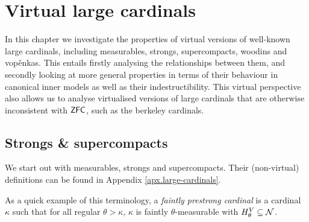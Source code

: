 \documentclass[../../main]{subfiles}
\begin{document}
\chapter{Virtual large cardinals}
\label{chapter.virtual-large-cardinals}
\thispagestyle{fancy}

In this chapter we investigate the properties of virtual versions of well-known large cardinals, including measurables, strongs, supercompacts, woodins and vop\v enkas. This entails firstly analysing the relationships between them, and secondly looking at more general properties in terms of their behaviour in canonical inner models as well as their indestructibility. This virtual perspective also allows us to analyse virtualised versions of large cardinals that are otherwise inconsistent with $\textsf{ZFC}$, such as the berkeley cardinals.


\section{Strongs \& supercompacts}

We start out with measurables, strongs and supercompacts. Their (non-virtual) definitions can be found in Appendix \ref{apx.large-cardinals}.


As a quick example of this terminology, a \textit{faintly prestrong cardinal} is a cardinal $\kappa$ such that for all regular $\theta>\kappa$, $\kappa$ is faintly $\theta$-measurable with $H_\theta^V\subseteq\operatorname{\mathcal N}$.
\end{document}
